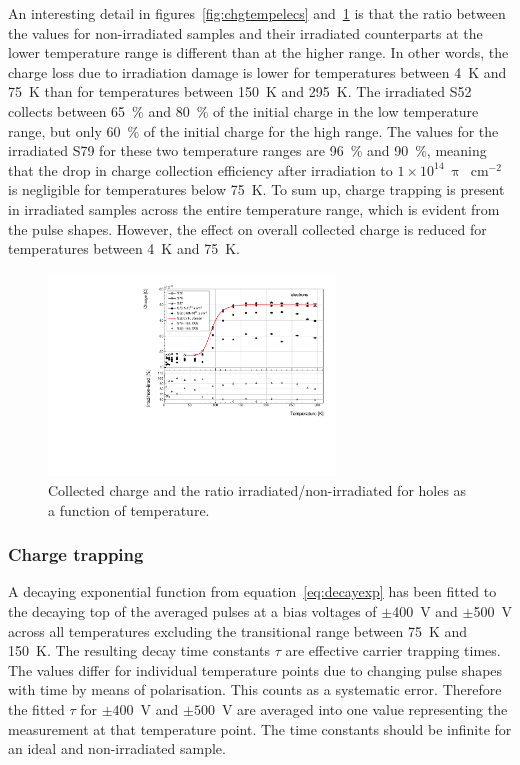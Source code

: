 An interesting detail in figures~\ref{fig:chgtempelecs} and~\ref{fig:chgtempholes} is that the ratio between the values for non-irradiated samples and their irradiated counterparts at the lower temperature range is different than at the higher range. In other words, the charge loss due to irradiation damage is lower for temperatures between 4~K and 75~K than for temperatures between 150~K and 295~K. The irradiated S52 collects between 65~\% and 80~\% of the initial charge in the low temperature range, but only 60~\% of the initial charge for the high range. The values for the irradiated S79 for these two temperature ranges are 96~\% and 90~\%, meaning that the drop in charge collection efficiency after irradiation to $1\times10^{14}~\uppi$~cm$^{-2}$ is negligible for temperatures below 75~K. To sum up, charge trapping is present in irradiated samples across the entire temperature range, which is evident from the pulse shapes. However, the effect on overall collected charge is reduced for temperatures between 4~K and 75~K.

\begin{figure}[!t]
\centering
\includegraphics[width=0.68\textwidth]{../scripts/03_experimental_results/plots/charge-500V-1}
\caption{Collected charge and the ratio irradiated/non-irradiated for holes as a function of temperature.}
 \label{fig:chgtempholes}
\end{figure}


\subsubsection{Charge trapping}
A decaying exponential function from equation~\ref{eq:decayexp} has been fitted to the decaying top of the averaged pulses at a bias voltages of $\pm$400~V and $\pm$500~V across all temperatures excluding the transitional range between 75~K and 150~K. The resulting decay time constants $\tau$ are effective carrier trapping times. The values differ for individual temperature points due to changing pulse shapes with time by means of polarisation. This counts as a systematic error. Therefore the fitted $\tau$ for $\pm400$~V and $\pm500$~V are averaged into one value representing the measurement at that temperature point. The time constants should be infinite for an ideal and non-irradiated sample. %

